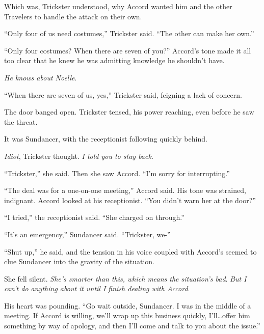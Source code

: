 Which was, Trickster understood, why Accord wanted him and the other Travelers to handle the attack on their own.



``Only four of us need costumes,'' Trickster said.  ``The other can make her own.''



``Only four costumes?  When there are seven of you?''  Accord's tone made it all too clear that he knew he was admitting knowledge he shouldn't have.



\emph{He knows about Noelle}.



``When there are seven of us, yes,'' Trickster said, feigning a lack of concern.



The door banged open.  Trickster tensed, his power reaching, even before he saw the threat.



It was Sundancer, with the receptionist following quickly behind.



\emph{Idiot}, Trickster thought.  \emph{I told you to stay back}.



``Trickster,'' she said.  Then she saw Accord.  ``I'm sorry for interrupting.''



``The deal was for a one-on-one meeting,'' Accord said.  His tone was strained, indignant.  Accord looked at his receptionist. ``You didn't warn her at the door?''



``I tried,'' the receptionist said.  ``She charged on through.''



``It's an emergency,'' Sundancer said.  ``Trickster, we-''



``Shut up,'' he said, and the tension in his voice coupled with Accord's seemed to clue Sundancer into the gravity of the situation.



She fell silent.  \emph{She's smarter than this, which means the situation's bad}.  \emph{But I can't do anything about it until I finish dealing with Accord}.



His heart was pounding.  ``Go wait outside, Sundancer.  I was in the middle of a meeting.  If Accord is willing, we'll wrap up this business quickly, I'll\ldots offer him something by way of apology, and then I'll come and talk to you about the issue.''



